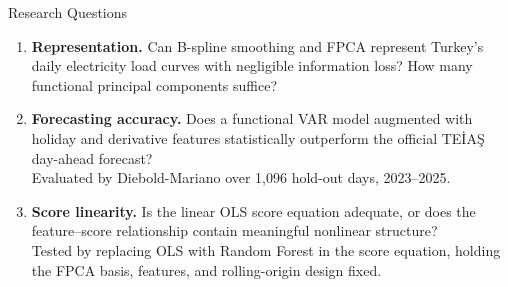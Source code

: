 \documentclass[10pt,aspectratio=169]{beamer}
\begin{document}
\begin{frame}{Research Questions}
  \begin{enumerate}
    \item \textbf{Representation.} Can B-spline smoothing and FPCA represent
          Turkey's daily electricity load curves with negligible information loss?
          How many functional principal components suffice?

    \vspace{0.5em}
    \item \textbf{Forecasting accuracy.} Does a functional VAR model augmented
          with holiday and derivative features statistically outperform the
          official TEİAŞ day-ahead forecast?\\
          {\small Evaluated by Diebold-Mariano over 1,096 hold-out days, 2023--2025.}

    \vspace{0.5em}
    \item \textbf{Score linearity.} Is the linear OLS score equation adequate, or
          does the feature--score relationship contain meaningful nonlinear structure?\\
          {\small Tested by replacing OLS with Random Forest in the score equation,
          holding the FPCA basis, features, and rolling-origin design fixed.}
  \end{enumerate}
\end{frame}
\end{document}
